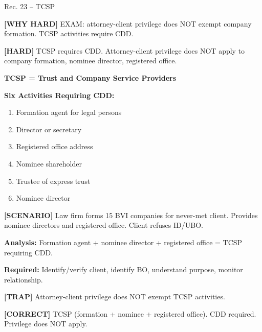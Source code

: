 \documentclass[6pt,aspectratio=169,fontsize=5pt]{beamer}
\renewcommand{\tiny}{\fontsize{3.5pt}{4.5pt}\selectfont}
\renewcommand{\normalsize}{\fontsize{7.5pt}{8.5pt}\selectfont}
\newcommand{\trap}[1]{%
	\begin{block}{\textcolor{redtrap}{\textbf{[TRAP]}}}
		\textcolor{redtrap}{\tiny #1}
	\end{block}
}
\newcommand{\scenario}[1]{%
	\begin{block}{\textbf{[SCENARIO]}}
		\tiny #1
	\end{block}
}
\newcommand{\correct}[1]{%
	\begin{block}{\textcolor{greencorrect}{\textbf{[CORRECT]}}}
		\textcolor{greencorrect}{\tiny #1}
	\end{block}
}
\newcommand{\hard}[1]{%
	\begin{block}{\textcolor{hardcolor}{\textbf{[HARD]}}}
		\textcolor{hardcolor}{\tiny #1}
	\end{block}
}
\newcommand{\hardexplain}[1]{%
	\begin{block}{\textcolor{orangehard}{\textbf{[WHY HARD]}}}
		\textcolor{orangehard}{\tiny #1}
	\end{block}
}
\begin{document}
	\begin{frame}{\normalsize Rec. 23 -- TCSP}
		
		\hardexplain{EXAM: attorney-client privilege does NOT exempt company formation. TCSP activities require CDD.}
		
		\hard{TCSP requires CDD. Attorney-client privilege does NOT apply to company formation, nominee director, registered office.}
		
		\textbf{TCSP = Trust and Company Service Providers}
		
		\textbf{Six Activities Requiring CDD:}
		\begin{enumerate}
			\item Formation agent for legal persons
			\item Director or secretary
			\item Registered office address
			\item Nominee shareholder
			\item Trustee of express trust
			\item Nominee director
		\end{enumerate}
		
		\scenario{Law firm forms 15 BVI companies for never-met client. Provides nominee directors and registered office. Client refuses ID/UBO.}
		
		\textbf{Analysis:} Formation agent + nominee director + registered office = TCSP requiring CDD.
		
		\textbf{Required:} Identify/verify client, identify BO, understand purpose, monitor relationship.
		
		\trap{Attorney-client privilege does NOT exempt TCSP activities.}
		
		\correct{TCSP (formation + nominee + registered office). CDD required. Privilege does NOT apply.}
	\end{frame}
	
\end{document}
